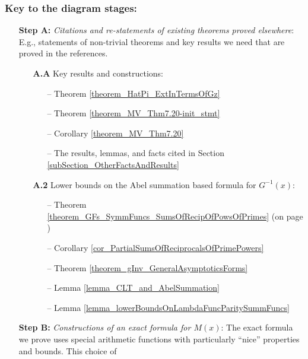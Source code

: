 \documentclass[11pt,reqno,a4letter]{article}
\numberwithin{figure}{section}
\numberwithin{table}{section}
\theoremstyle{plain}
\numberwithin{theorem}{section}
\theoremstyle{definition}
\begin{document}
\subsubsection*{Key to the diagram stages: } 
\begin{itemize}[noitemsep,topsep=0pt]

\item[\textbf{Step A:}] \textit{Citations and re-statements of existing theorems proved elsewhere}: 
     E.g., statements of non-trivial theorems and key results we need that are proved in the references. 
     \begin{itemize}[noitemsep,topsep=0pt] 
     \item[\textbf{A.A}] Key results and constructions: 
          \begin{itemize}[noitemsep,topsep=0pt]
          \item[--] \small{Theorem \ref{theorem_HatPi_ExtInTermsOfGz}} 
          \item[--] \small{Theorem \ref{theorem_MV_Thm7.20-init_stmt}} 
          \item[--] \small{Corollary \ref{theorem_MV_Thm7.20}} 
          \item[--] \small{The results, lemmas, and facts cited in Section \ref{subSection_OtherFactsAndResults}}
          \end{itemize} 
     \item[\textbf{A.2}] Lower bounds on the Abel summation based formula for $G^{-1}(x)$: 
          \begin{itemize}[noitemsep,topsep=0pt]
          \item[--] \small{Theorem \ref{theorem_GFs_SymmFuncs_SumsOfRecipOfPowsOfPrimes} 
                    (on page \pageref{proofOf_theorem_GFs_SymmFuncs_SumsOfRecipOfPowsOfPrimes})} 
          \item[--] \small{Corollary \ref{cor_PartialSumsOfReciprocalsOfPrimePowers}} 
          \item[--] \small{Theorem \ref{theorem_gInv_GeneralAsymptoticsForms}} 
          \item[--] \small{Lemma \ref{lemma_CLT_and_AbelSummation}} 
          \item[--] \small{Lemma \ref{lemma_lowerBoundsOnLambdaFuncParitySummFuncs}} 
          \end{itemize} 
     \end{itemize} 
\item[\textbf{Step B:}] \textit{Constructions of an exact formula for $M(x)$}: The exact formula we prove 
     uses special arithmetic functions with particularly ``nice'' properties and bounds. This choice of 

\end{itemize}
\end{document}
